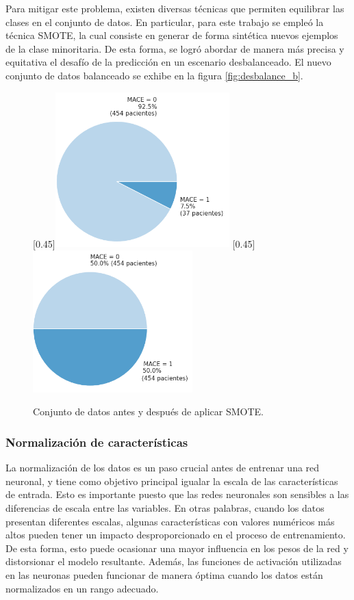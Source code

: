 Para mitigar este problema, existen diversas técnicas que permiten equilibrar las clases en el conjunto de datos. 
En particular, para este trabajo se empleó la técnica SMOTE, la cual consiste en generar de forma sintética nuevos 
ejemplos de la clase minoritaria. De esta forma, se logró abordar de manera más precisa y equitativa el desafío 
de la predicción en un escenario desbalanceado. El nuevo conjunto de datos balanceado se exhibe en la figura \ref{fig:desbalance_b}.


\begin{figure}[h!]
	\centering
	\hspace{1em}
	[0.45\linewidth]{\includegraphics[height=6cm]{./Figures/desbalance_pie.png}}
	\hspace{1em}
	[0.45\linewidth]{\includegraphics[height=5.5cm]{./Figures/desbalance_smote_pie.png}}
	\caption{Conjunto de datos antes y después de aplicar SMOTE.}
\end{figure}

\subsubsection{Normalización de características}
La normalización de los datos es un paso crucial antes de entrenar una red neuronal, y tiene como 
objetivo principal igualar la escala de las características de entrada. Esto es importante puesto 
que las redes neuronales son sensibles a las diferencias de escala entre las variables. En otras 
palabras, cuando los datos presentan diferentes escalas, algunas características con valores numéricos 
más altos pueden tener un impacto desproporcionado en el proceso de entrenamiento. De esta forma, 
esto puede ocasionar una mayor influencia en los pesos de la red y distorsionar el modelo resultante. 
Además, las funciones de activación utilizadas en las neuronas pueden funcionar de manera óptima 
cuando los datos están normalizados en un rango adecuado.

